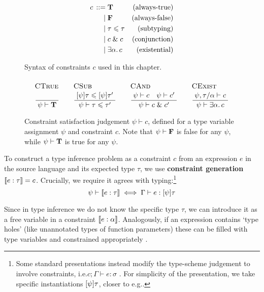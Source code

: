 \begin{figure}
    \centering
    \begin{align*}
        {c} \,::=&\; 
        \mathbf T
        & \text{(always-true)}
        \\ \mid&\;
        \mathbf F
        & \text{(always-false)}
        \\ \mid&\;
        \tau \leqslant \tau 
        & \text{(subtyping)}
        \\ \mid&\;
        c \;\&\; c
         & \text{(conjunction)}
        \\ \mid&\; 
        \exists \alpha \ldotp c
        & \text{(existential)}
    \end{align*}
    \caption{Syntax of constraints $c$ used in this chapter.}
    \label{fig:constraints}
\end{figure}

\begin{figure}
    \centering
    $$
    \irule{CTrue}{}{\psi \vdash \tru}
    \quad
    \irule{CSub}{\substx \psi \tau \sub \substx \psi \tau'}{\psi \vdash \tau \sub \tau'}
    \quad
    \irule{CAnd}{\psi \vdash c \quad \psi \vdash c'}{\psi \vdash c \und c'}
    \quad 
    \irule{CExist}{\psi, \tau/\alpha \vdash c}{\psi \vdash \exists \alpha \ldotp c}
    $$
    \caption{Constraint satisfaction judgement $\psi \vdash c$, defined for a type variable assignment $\psi$ and constraint $c$. Note that $\psi \vdash \mathbf F$ is false for any $\psi$, while $\psi \vdash \mathbf T$ is true for any $\psi$.}
    \label{fig:satisfaction}
\end{figure}
 
To construct a type inference problem as a constraint $c$ from an expression $e$ in the source language and its expected type $\tau$, we use \textbf{constraint generation} $\denot{e : \tau} = c$. Crucially, we require it agrees with typing:\footnote{Some standard presentations instead modify the type-scheme judgement to involve constraints, i.e.\@ $c; \Gamma \vdash e : \sigma$ \cite{essence-of-ml-type-inference}. For simplicity of the presentation, we take specific instantiations $\substx \psi \tau$, closer to e.g.\@ \cite[Section 3.4]{constraint-based-freeze-ml}.}
$$ \psi \vdash \denot{e : \tau} \iff \Gamma \vdash e : \substx \psi \tau $$

Since in type inference we do not know the specific type $\tau$, we can introduce it as a free variable in a constraint $\denot{e : \alpha}$. Analogously, if an expression contains `type holes' (like unannotated types of function parameters) these can be filled with type variables and constrained appropriately \cite{tapl}.

